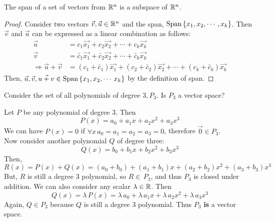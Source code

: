 \begin{thm}{}{}
    The span of a set of vectors from $\mathbb R^{n}$ is a subspace of $\mathbb R^{n}$. 
    \begin{proof}
        Consider two vectors $\vec{v}, \vec{u} \in \mathbb R^{n}$ and the span, $\text{Span}\left\{x_1, x_2, \cdots\,, x_k \right\}$. Then $\vec{v}$ and $\vec{u}$ can be expressed as a linear combination as follows:
        \begin{align*}
            \vec{u} &= c_1\vec{x_1} + c_2\vec{x_2} + \cdots + c_k\vec{x_k} \\
            \vec{v} &= \tilde{c_1}\vec{x_1} + \tilde{c_2}\vec{x_2} + \cdots + \tilde{c_k}\vec{x_k} \\
            \Rightarrow \vec{u} + \vec{v} &= \left(c_1 + \tilde{c_1}\right)\vec{x_1} + \left(c_2 + \tilde{c_2}\right)\vec{x_2} + \cdots + \left(c_k + \tilde{c_k}\right)\vec{x_k}
        \end{align*}
        Then, $\vec{u}, \vec{v}, \vec{u+v} \in \text{Span}\left\{x_1, x_2, \cdots\, x_k \right\}$ by the definition of span.
    \end{proof} 
\end{thm}

\begin{example}{}{}
    Consider the set of all polynomials of degree $3, P_3$. Is $P_3$ a vector space?

    \begin{solution}
        Let $P$ be any polynomial of degree $3$. Then 
        \[
            P\left(x\right) = a_0 + a_1x + a_2x^2 + a_3x^3 
        \]
        We can have $P\left(x\right) = 0$ if $\forall x\, a_0=a_1=a_2=a_3=0$, therefore $\vec{0} \in P_3$. \\ Now consider another polynomial $Q$ of degree three:
        \[
            Q\left(x\right) = b_0 + b_1x + b_2x^2 + b_3x^3 
        \]
        Then, 
        \[
            R\left(x\right) = P\left(x\right) + Q\left(x\right) = \left(a_0 + b_0\right) + \left(a_1 + b_1\right)x + \left(a_2 + b_2\right)x^2 + \left(a_3 + b_3\right)x^3 
        \]
        But, $R$ is still a degree $3$ polynomial, so $R\in\,P_3$, and thus $P_3$ is closed under addition. We can also consider any scalar $\lambda \in \mathbb R$. Then 
        \[
            Q\left(x\right) = \lambda\,P\left(x\right) = \lambda\,a_0 + \lambda\,a_1x + \lambda\,a_2x^2 + \lambda\,a_3x^3 
        \]
        Again, $Q \in P_3$ because $Q$ is still a degree $3$ polynomial. Thus $P_3$ \textbf{is} a vector space. 
    \end{solution}
\end{example}

